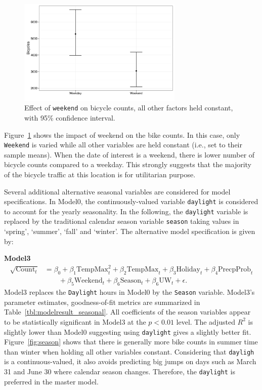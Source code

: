 \documentclass [11pt, proquest] {uwthesis}[2015/03/03]
\begin{document}
\begin{figure}
\centering
  \includegraphics[width=0.7\textwidth]{figures/sim/Wknd}
  \caption{Effect of \texttt{weekend} on bicycle counts, all other factors held constant, with 95\% confidence interval.}
  \label{fig:weekend}
\end{figure}

Figure~\ref{fig:weekend} shows the impact of weekend on the bike counts. In this case, only \texttt{Weekend} is varied while all other variables are held constant (i.e., set to their sample means). When the date of interest is a weekend, there is lower number of bicycle counts compared to a weekday. This strongly suggests that the majority of the bicycle traffic at this location is for utilitarian purpose. 

Several additional alternative seasonal variables are considered for model specifications. In Model0,  the continuously-valued variable \texttt{daylight} is considered to account for the yearly seasonality. In the following, the \texttt{daylight} variable is replaced by the traditional calendar season variable \texttt{season} taking values in `spring', `summer', `fall' and `winter'. The alternative model specification is given by:

\textbf{Model3}
\begin{align}
\sqrt{\text{Count}_t} &= \beta_0 + \beta_1 \text{TempMax}^2_t + \beta_2 \text{TempMax}_t + \beta_3 \text{Holiday}_t + \beta_4 \text{PrecpProb}_t  \nonumber\\
&\qquad + \beta_5 \text{Weekend}_t + \beta_6 \text{Season}_t + \beta_6 \text{UW}_t + \epsilon.\label{eqn:model3}
\end{align}
Model3 replaces the \texttt{Daylight} hours in Model0 by the \texttt{Season} variable. Model3's parameter estimates, goodness-of-fit metrics are summarized in Table~\ref{tbl:modelresult_seasonal}. All coefficients of the season variables appear to be statistically significant in Model3 at the $p<0.01$ level. The adjusted $R^2$ is slightly lower than Model0 suggesting using \texttt{daylight} gives a slightly better fit. Figure~\ref{fig:season} shows that there is generally more bike counts in summer time than winter when holding all other variables constant. Considering that \texttt{dayligh} is a continuous-valued, it also avoids predicting big jumps on days such as March 31 and June 30 where calendar season changes. Therefore, the \texttt{daylight} is preferred in the master model.
\end{document}
